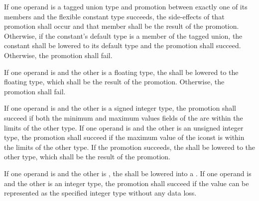 \specsubitem
If one operand is a tagged union type and promotion between exactly one of its
members and the flexible constant type succeeds, the side-effects of that
promotion shall occur and that member shall be the result of the promotion.
Otherwise, if the constant's default type is a member of the tagged union, the
constant shall be lowered to its default type and the promotion shall succeed.
Otherwise, the promotion shall fail.

\specsubitem
If one operand is  and the other is a floating type, the
 shall be lowered to the floating type, which shall be the
result of the promotion. Otherwise, the promotion shall fail.


\specsubitem
If one operand is  and the other is a signed integer type, the
promotion shall succeed if both the minimum and maximum values fields of the
 are within the limits of the other type. If one operand is
 and the other is an unsigned integer type, the promotion shall
succeed if the maximum value of the iconst is within the limits of the other
type. If the promotion succeeds, the  shall be lowered to the
other type, which shall be the result of the promotion.

\specsubitem
If one operand is  and the other is , the
 shall be lowered into a . If one operand is
 and the other is an integer type, the promotion shall succeed
if the  value can be represented as the specified integer type
without any data loss.

